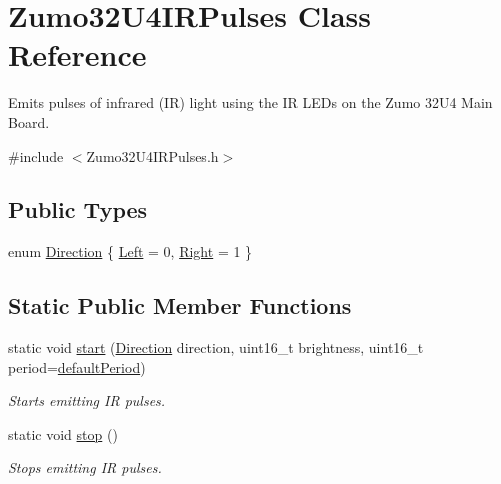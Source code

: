 \hypertarget{class_zumo32_u4_i_r_pulses}{}\section{Zumo32\+U4\+I\+R\+Pulses Class Reference}
\label{class_zumo32_u4_i_r_pulses}


Emits pulses of infrared (IR) light using the IR L\+E\+Ds on the Zumo 32\+U4 Main Board.  




{\ttfamily \#include $<$Zumo32\+U4\+I\+R\+Pulses.\+h$>$}

\subsection*{Public Types}
\begin{DoxyCompactItemize}
\item 
enum \hyperlink{class_zumo32_u4_i_r_pulses_a5252acaa381240e6b8ca499eaf304616}{Direction} \{ \hyperlink{class_zumo32_u4_i_r_pulses_a5252acaa381240e6b8ca499eaf304616a2283d2a79677f38342a09416734ad9e7}{Left} = 0, 
\hyperlink{class_zumo32_u4_i_r_pulses_a5252acaa381240e6b8ca499eaf304616abc5bb22fe2cce8d4c31f297de25d5852}{Right} = 1
 \}
\end{DoxyCompactItemize}
\subsection*{Static Public Member Functions}
\begin{DoxyCompactItemize}
\item 
static void \hyperlink{class_zumo32_u4_i_r_pulses_abef1e5f17a173505c6acc0f8c0d917d9}{start} (\hyperlink{class_zumo32_u4_i_r_pulses_a5252acaa381240e6b8ca499eaf304616}{Direction} direction, uint16\+\_\+t brightness, uint16\+\_\+t period=\hyperlink{class_zumo32_u4_i_r_pulses_ae72ab04d5b682b3170a1542344cb3f75}{default\+Period})
\begin{DoxyCompactList}\small\item\em Starts emitting IR pulses. \end{DoxyCompactList}\item 
static void \hyperlink{class_zumo32_u4_i_r_pulses_a99f222656413341fc07bd8fed823027b}{stop} ()
\begin{DoxyCompactList}\small\item\em Stops emitting IR pulses. \end{DoxyCompactList}\end{DoxyCompactItemize}
